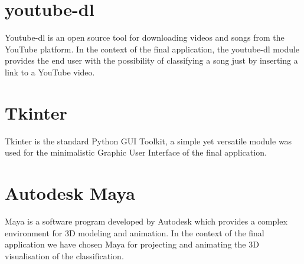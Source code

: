 \section{youtube-dl}
Youtube-dl is an open source tool for downloading videos and songs from the YouTube platform. In the
context of the final application, the youtube-dl module provides the end user with the possibility of classifying
a song just by inserting a link to a YouTube video.

\section{Tkinter}
Tkinter is the standard Python GUI Toolkit, a simple yet versatile module was used for the minimalistic Graphic
User Interface of the final application.

\section{Autodesk Maya}
Maya is a software program developed by Autodesk which provides a complex environment
for 3D modeling and animation. In the context of the final application we have chosen Maya for projecting and
animating the 3D visualisation of the classification.
